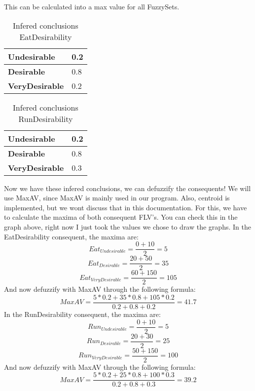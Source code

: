 This can be calculated into a max value for all FuzzySets.
\begin{table}[ht]
    \centering
    \label{InferedConclusionsEatDesirability}
    \begin{tabular}{|l|l|}
        \hline
        \textbf{Undesirable}   & 0.2 \\ \hline
        \textbf{Desirable}     & 0.8 \\ \hline
        \textbf{VeryDesirable} & 0.2 \\ \hline
    \end{tabular}
    \caption{Infered conclusions EatDesirability}
\end{table}
\begin{table}[ht]
    \centering
    \label{InferedConclusionsRunDesirability}
    \begin{tabular}{|l|l|}
        \hline
        \textbf{Undesirable}   & 0.2   \\ \hline
        \textbf{Desirable}     & 0.8 \\ \hline
        \textbf{VeryDesirable} & 0.3 \\ \hline
    \end{tabular}
    \caption{Infered conclusions RunDesirability}
\end{table}
Now we have these infered conclusions, we can defuzzify the consequents!
We will use MaxAV, since MaxAV is mainly used in our program.
Also, centroid is implemented, but we wont discuss that in this documentation.
For this, we have to calculate the maxima of both consequent FLV's.
You can check this in the graph above, right now I just took the values we chose to draw the graphs.
In the EatDesirability consequent, the maxima are:
\begin{equation}
    Eat_{Undesirable} = \frac{0 + 10}2 = 5
\end{equation}
\begin{equation}
    Eat_{Desirable} = \frac{20 + 50}2 = 35
\end{equation}
\begin{equation}
    Eat_{VeryDesirable} = \frac{60 + 150}2 = 105
\end{equation}
And now defuzzify with MaxAV through the following formula:
\begin{equation}
    MaxAV = \frac{5 * 0.2 + 35 * 0.8 + 105 * 0.2}{0.2 + 0.8 + 0.2} = 41.7
\end{equation}
In the RunDesirability consequent, the maxima are:
\begin{equation}
    Run_{Undesirable} = \frac{0 + 10}2 = 5
\end{equation}
\begin{equation}
    Run_{Desirable} = \frac{20 + 30}2 = 25
\end{equation}
\begin{equation}
    Run_{VeryDesirable} = \frac{50 + 150}2 = 100
\end{equation}
And now defuzzify with MaxAV through the following formula:
\begin{equation}
    MaxAV = \frac{5 * 0.2 + 25 * 0.8 + 100 * 0.3}{0.2 + 0.8 + 0.3} = 39.2
\end{equation}

